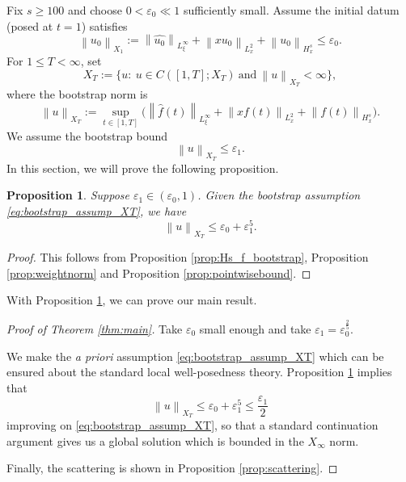 \documentclass[reqno,english,11pt]{amsart}
\newcommand{\eps}{\varepsilon}
\newcommand{\snorm}[1]{\left\|#1\right\|}
\newtheorem{proposition}[theorem]{Proposition}
\theoremstyle{definition}
\numberwithin{equation}{section}
\begin{document}
Fix $s\geq 100$ and choose $0<\eps_0\ll 1$ sufficiently small.
Assume the initial datum (posed at $t=1$) satisfies
\begin{equation}\label{eq:X1-small}
\snorm{u_0}_{X_1}:= \snorm{\widehat{u_0}}_{L^\infty_\xi}+\snorm{x u_0}_{L^2_x}+\snorm{u_0}_{H^s_x} \leq \eps_0.
\end{equation}
For $1\leq T<\infty$, set
$$X_T:=\Big\{u:\ u\in C([1,T];X_T)\ \text{and}\ \snorm{u}_{X_T}<\infty\Big\},$$
where the bootstrap norm is
\begin{equation}\label{eq:XT-norm}
\snorm{u}_{X_T}:=\sup_{t\in[1,T]}\Big(\snorm{\widehat f(t)}_{L^\infty_\xi}+\snorm{x f(t)}_{L^2_x}+ \snorm{f(t)}_{H^s_x}\Big).
\end{equation}
We assume the bootstrap bound
\begin{equation}\label{eq:bootstrap_assump_XT}
\snorm{u}_{X_T}\le \eps_1.
\end{equation}
In this section, we will prove the following proposition.
\begin{proposition}\label{prop:bootstrap}
    Suppose $\eps_1\in (\eps_0,1)$. Given the bootstrap assumption \eqref{eq:bootstrap_assump_XT}, we have
    \begin{equation}\label{aprioriweakbound}
        \snorm{u}_{X_T}\leq \eps_0+\eps_1^5.
    \end{equation}
\end{proposition}
\begin{proof}
This follows from Proposition \ref{prop:Hs_f_bootstrap}, Proposition \ref{prop:weightnorm} and Proposition \ref{prop:pointwisebound}.
\end{proof}
With Proposition \ref{prop:bootstrap}, we can prove our main result.
\begin{proof}[Proof of Theorem \ref{thm:main}]

Take $\eps_0$ small enough and take $\eps_1=\eps_0^{\frac{2}{5}}$. 


We make the {\it a priori} assumption \eqref{eq:bootstrap_assump_XT} which can be ensured about the standard local well-posedness theory.   Proposition \ref{prop:bootstrap} implies that
\begin{equation}
      \snorm{u}_{X_T}\leq \eps_0+\eps_1^5\leq \frac{\eps_1}{2}
\end{equation}improving on \eqref{eq:bootstrap_assump_XT}, so that a standard continuation argument gives us a global solution which is bounded in the $X_\infty$ norm. 

Finally, the scattering is shown in Proposition \ref{prop:scattering}.
\end{proof}
\end{document}
